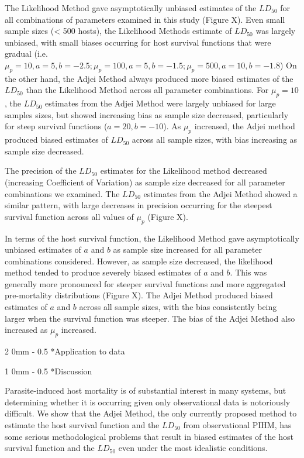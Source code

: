 \documentclass[12pt, a4paper]{article}
\makeatletter
\renewcommand{\section}{\@startsection
{section}%
{1}%
{0mm}%
{-\baselineskip}%
{0.5\baselineskip}%
{\normalfont\bf\large}} %
\renewcommand{\subsection}{\@startsection
{subsection}%
{2}%
{0mm}%
{-\baselineskip}%
{0.5\baselineskip}%
{\normalfont\bf}} %
\makeatother
\begin{document}
The Likelihood Method gave asymptotically unbiased estimates of the $LD_{50}$ for all combinations of parameters examined in this study (Figure X).  Even small sample sizes (< 500 hosts), the Likelihood Methods estimate of $LD_{50}$ was largely unbiased, with small biases occurring for host survival functions that were gradual (i.e. $\mu_p = 10, a = 5, b = -2.5; \mu_p = 100, a = 5, b= -1.5; \mu_p = 500, a = 10, b = -1.8$)   On the other hand, the Adjei Method always produced more biased estimates of the $LD_{50}$ than the Likelihood Method across all parameter combinations.  For $\mu_p = 10$, the $LD_{50}$ estimates from the Adjei Method were largely unbiased for large samples sizes, but showed increasing bias as sample size decreased, particularly for steep survival functions ($a = 20, b = -10$).  As $\mu_p$ increased, the Adjei method produced biased estimates of $LD_{50}$ across all sample sizes, with bias increasing as sample size decreased.

The precision of the $LD_{50}$ estimates for the Likelihood method decreased (increasing Coefficient of Variation) as sample size decreased for all parameter combinations we examined.  The $LD_{50}$ estimates from the Adjei Method showed a similar pattern, with large decreases in precision occurring for the steepest survival function across all values of $\mu_p$ (Figure X).

In terms of the host survival function, the Likelihood Method gave
asymptotically unbiased estimates of $a$ and $b$ as sample size increased for
all parameter combinations considered.  However, as sample size decreased, the
likelihood method tended to produce severely biased estimates of $a$ and $b$.
This was generally more pronounced for steeper survival functions and more
aggregated pre-mortality distributions (Figure X).  The Adjei Method produced
biased estimates of $a$ and $b$ across all sample sizes, with the bias
consistently being larger when the survival function was steeper. The bias of
the Adjei Method also increased as $\mu_p$ increased.

\subsection*{Application to data}

\section*{Discussion}

Parasite-induced host mortality is of substantial interest in many systems, but determining whether it is occurring given only observational data is notoriously difficult.  We show that the Adjei Method, the only currently proposed method to estimate the host survival function and the $LD_{50}$ from observational PIHM, has some serious methodological problems that result in biased estimates of the host survival function and the $LD_{50}$ even under the most idealistic conditions.
\end{document}
